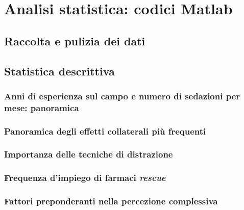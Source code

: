 \chapter{Analisi statistica: codici Matlab\textsuperscript{\protect\tiny\sffamily\textregistered}}
\label{appendix:code}

\section{Raccolta e pulizia dei dati}
\label{code:wrangling}

    
    \newpage

\section{Statistica descrittiva}


    \subsection{Anni di esperienza sul campo e numero di sedazioni per mese: panoramica}
    \label{code:seniority-vs-experience}
    
    \newpage
    
    \subsection{Panoramica degli effetti collaterali più frequenti}
    \label{code:adverse-effects-incidence}
    
    \newpage

    \subsection{Importanza delle tecniche di distrazione}
    \label{code:misdirection-techniques}
    
    \newpage

    \subsection{Frequenza d'impiego di farmaci \emph{rescue}}
    \label{code:rescue}
    
    \newpage

    \subsection{Fattori preponderanti nella percezione complessiva}
    \label{code:satisfaction}
    
    \newpage

